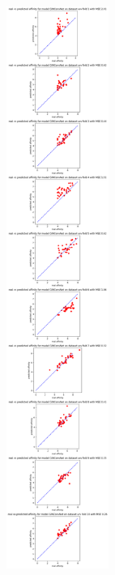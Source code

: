 \documentclass[11pt, a4paper]{article}
\begin{document}
    \begin{center}
        \includegraphics[width=0.25\textwidth]{GINCONV_folds10predictions.png}
    \end{center}
\end{document}
